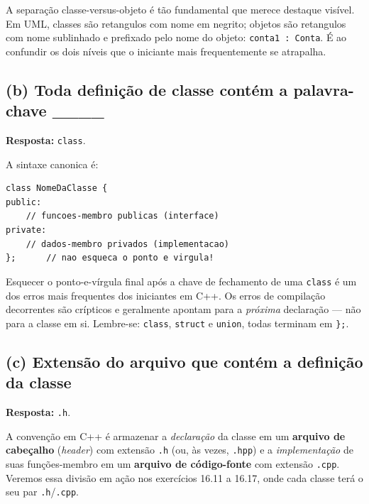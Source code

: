 \documentclass[11pt,a4paper]{article}
\begin{document}
\begin{obseng}
A separa\c{c}\~ao classe-versus-objeto \'e t\~ao fundamental que merece destaque vis\'ivel. Em UML, classes s\~ao retangulos com nome em negrito; objetos s\~ao retangulos com nome sublinhado e prefixado pelo nome do objeto: \texttt{conta1 : Conta}. \'E ao confundir os dois n\'iveis que o iniciante mais frequentemente se atrapalha.
\end{obseng}

\subsection*{(b) Toda defini\c{c}\~ao de classe cont\'em a palavra-chave ____}

\begin{resposta}\textbf{Resposta:} \texttt{class}.\end{resposta}

A sintaxe canonica \'e:
\begin{lstlisting}[style=cppcode,numbers=none]
class NomeDaClasse {
public:
    // funcoes-membro publicas (interface)
private:
    // dados-membro privados (implementacao)
};      // nao esqueca o ponto e virgula!
\end{lstlisting}

\begin{errocomum}
Esquecer o ponto-e-v\'irgula final ap\'os a chave de fechamento de uma \texttt{class} \'e um dos erros mais frequentes dos iniciantes em C++. Os erros de compila\c{c}\~ao decorrentes s\~ao crípticos e geralmente apontam para a \emph{pr\'oxima} declara\c{c}\~ao --- n\~ao para a classe em si. Lembre-se: \texttt{class}, \texttt{struct} e \texttt{union}, todas terminam em \texttt{\};}.
\end{errocomum}

\subsection*{(c) Extens\~ao do arquivo que cont\'em a defini\c{c}\~ao da classe}

\begin{resposta}\textbf{Resposta:} \texttt{.h}.\end{resposta}

A conven\c{c}\~ao em C++ \'e armazenar a \emph{declara\c{c}\~ao} da classe em um \textbf{arquivo de cabe\c{c}alho} (\emph{header}) com extens\~ao \texttt{.h} (ou, \`as vezes, \texttt{.hpp}) e a \emph{implementa\c{c}\~ao} de suas fun\c{c}\~oes-membro em um \textbf{arquivo de c\'odigo-fonte} com extens\~ao \texttt{.cpp}. Veremos essa divis\~ao em a\c{c}\~ao nos exerc\'icios 16.11 a 16.17, onde cada classe ter\'a o seu par \texttt{.h}/\texttt{.cpp}.
\end{document}
